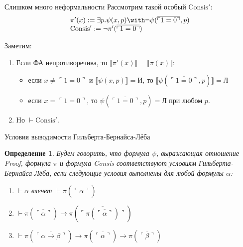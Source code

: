 \documentclass[aspectratio=169]{beamer}
\newtheorem{dfn}{Определение}[section]
\begin{document}
\begin{frame}{Слишком много неформальности}
Рассмотрим такой особый $\text{Consis}'$:
$$\begin{array}{l}\pi'(x) := \exists p.\psi(x,p) \with \neg\psi(\overline{\ulcorner 1 = 0 \urcorner},p)\\
                  \text{Consis}' := \neg\pi'(\overline{\ulcorner 1 = 0 \urcorner})\end{array}$$

Заметим:
\begin{enumerate}
\item Если ФА непротиворечива, то $\llbracket \pi'(x) \rrbracket = \llbracket \pi(x) \rrbracket$:
\begin{itemize}
\item если $x \ne \ulcorner 1 = 0 \urcorner$ и $\llbracket\psi(x,p)\rrbracket = \text{И}$, 
то $\llbracket\psi(\overline{\ulcorner 1 = 0\urcorner},p)\rrbracket = \text{Л}$
\item если $x = \ulcorner 1 = 0 \urcorner$, то $\psi(\overline{\ulcorner 1 = 0 \urcorner},p) = \text{Л}$ при любом $p$.
\end{itemize}
\item Но $\vdash \text{Consis}'$.
\end{enumerate}
\end{frame}

\begin{frame}{Условия выводимости Гильберта-Бернайса-Лёба}
\begin{dfn}
Будем говорить, что формула $\psi$, выражающая отношение Proof, 
формула $\pi$ и формула Consis соответствуют
условиям Гильберта-Бернайса-Лёба, если следующие условия выполнены для любой формулы $\alpha$:

\begin{enumerate}
\item $\vdash \alpha$ влечет $\vdash \pi(\overline{\ulcorner\alpha\urcorner})$
\item $\vdash \pi (\overline{\ulcorner\alpha\urcorner}) \rightarrow \pi(\overline{\ulcorner\pi(\overline{\ulcorner\alpha\urcorner})\urcorner})$
\item $\vdash \pi (\overline{\ulcorner\alpha\rightarrow \beta\urcorner}) \rightarrow \pi(\overline{\ulcorner\alpha\urcorner}) \rightarrow \pi(\overline{\ulcorner\beta\urcorner})$
\end{enumerate}
\end{dfn}
\end{frame}
\end{document}

